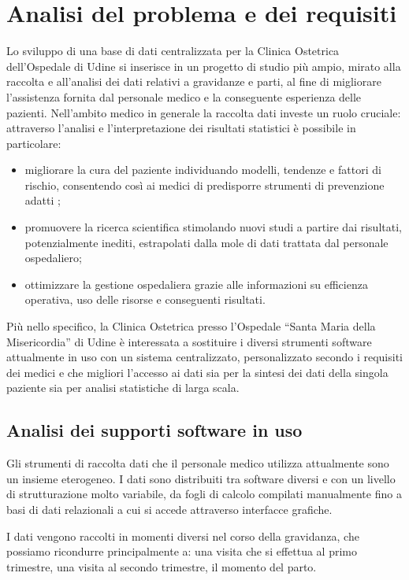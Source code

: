 \chapter{Analisi del problema e dei requisiti}

Lo sviluppo di una base di dati centralizzata per la Clinica Ostetrica dell'Ospedale di Udine si inserisce in un progetto di studio più ampio, mirato alla raccolta e all'analisi dei dati relativi a gravidanze e parti, al fine di migliorare l'assistenza fornita dal personale medico e la conseguente esperienza delle pazienti.
Nell'ambito medico in generale la raccolta dati investe un ruolo cruciale: attraverso l'analisi e l'interpretazione dei risultati statistici è possibile in particolare:
\begin{itemize}
\item migliorare la cura del paziente individuando modelli, tendenze e fattori di rischio, consentendo così ai medici di predisporre strumenti di prevenzione adatti \cite{Cor20,McC16};
\item promuovere la ricerca scientifica stimolando nuovi studi a partire dai risultati, potenzialmente inediti, estrapolati dalla mole di dati trattata dal personale ospedaliero;
\item ottimizzare la gestione ospedaliera grazie alle informazioni su efficienza operativa, uso delle risorse e conseguenti risultati.
\end{itemize}
Più nello specifico, la Clinica Ostetrica presso l'Ospedale \enquote{Santa Maria della Misericordia} di Udine è interessata a sostituire i diversi strumenti software attualmente in uso con un sistema centralizzato, personalizzato secondo i requisiti dei medici e che migliori l'accesso ai dati sia per la sintesi dei dati della singola paziente sia per analisi statistiche di larga scala.

\section{Analisi dei supporti software in uso}

Gli strumenti di raccolta dati che il personale medico utilizza attualmente sono un insieme eterogeneo. I dati sono distribuiti tra software diversi e con un livello di strutturazione molto variabile, da fogli di calcolo compilati manualmente fino a basi di dati relazionali a cui si accede attraverso interfacce grafiche.

I dati vengono raccolti in momenti diversi nel corso della gravidanza, che possiamo ricondurre principalmente a: una visita che si effettua al primo trimestre, una visita al secondo trimestre, il momento del parto.